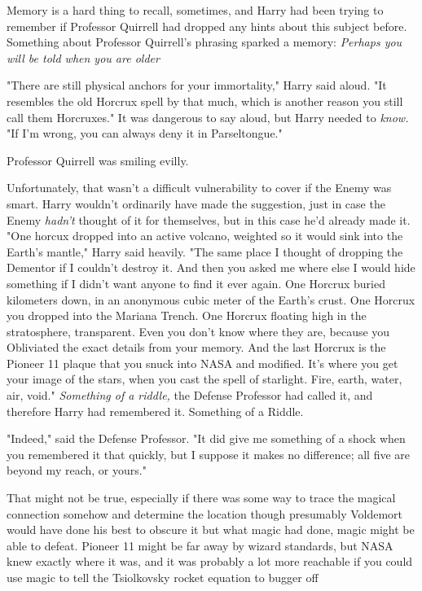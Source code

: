 Memory is a hard thing to recall, sometimes, and Harry had been trying to
remember if Professor Quirrell had dropped any hints about this subject before.
Something about Professor Quirrell's phrasing sparked a memory: \emph{Perhaps
you will be told when you are older{\el}}

"There are still physical anchors for your immortality," Harry said aloud. "It
resembles the old Horcrux spell by that much, which is another reason you still
call them Horcruxes." It was dangerous to say aloud, but Harry needed to
\emph{know.} "If I'm wrong, you can always deny it in Parseltongue."

Professor Quirrell was smiling evilly. 

Unfortunately, that wasn't a difficult vulnerability to cover if the Enemy was
smart. Harry wouldn't ordinarily have made the suggestion, just in case the
Enemy \emph{hadn't} thought of it for themselves, but in this case he'd already
made it. "One horcux dropped into an active volcano, weighted so it would sink
into the Earth's mantle," Harry said heavily. "The same place I thought of
dropping the Dementor if I couldn't destroy it. And then you asked me where
else I would hide something if I didn't want anyone to find it ever again. One
Horcrux buried kilometers down, in an anonymous cubic meter of the Earth's
crust. One Horcrux you dropped into the Mariana Trench. One Horcrux floating
high in the stratosphere, transparent. Even you don't know where they are,
because you Obliviated the exact details from your memory. And the last Horcrux
is the Pioneer 11 plaque that you snuck into NASA and modified. It's where you
get your image of the stars, when you cast the spell of starlight. Fire, earth,
water, air, void." \emph{Something of a riddle,} the Defense Professor had
called it, and therefore Harry had remembered it. Something of a Riddle.

"Indeed," said the Defense Professor. "It did give me something of a shock when
you remembered it that quickly, but I suppose it makes no difference; all five
are beyond my reach, or yours."

That might not be true, especially if there was some way to trace the magical
connection somehow and determine the location{\el} though presumably
Voldemort would have done his best to obscure it{\el} but what magic had
done, magic might be able to defeat. Pioneer 11 might be far away by wizard
standards, but NASA knew exactly where it was, and it was probably a lot more
reachable if you could use magic to tell the Tsiolkovsky rocket equation to
bugger off{\el}


